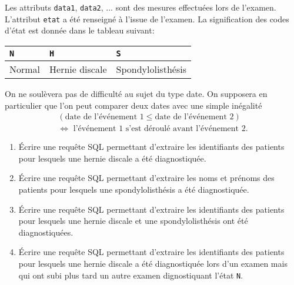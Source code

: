 Les attributs \texttt{data1}, \texttt{data2}, ... sont des mesures effectuées lors de l'examen. L'attribut \texttt{etat} a été renseigné à l'issue de l'examen. La signification des codes d'état est donnée dans le tableau suivant:
\begin{center}
\renewcommand{\arraystretch}{1.2}
\begin{tabular}{|l|l|l|} \hline
\texttt{N} & \texttt{H}     & \texttt{S} \\ \hline
Normal     & Hernie discale & Spondylolisthésis \\ \hline
\end{tabular}
\end{center}
On ne soulèvera pas de difficulté au sujet du type \og date\fg. On supposera en particulier que l'on peut comparer deux dates avec une simple inégalité
\begin{multline*}
 \left( \text{date de l'événement 1} \leq \text{date de l'événement 2}\right)\\
 \Leftrightarrow \text{ l'événement 1 s'est déroulé avant l'événement 2}.
\end{multline*}
\begin{enumerate}
 \item \'Ecrire une requête SQL permettant d'extraire les identifiants des patients pour lesquels une hernie discale a été diagnostiquée.
 \item \'Ecrire une requête SQL permettant d'extraire les noms et prénoms des patients pour lesquels une spondylolisthésis a été diagnostiquée.
 \item \'Ecrire une requête SQL permettant d'extraire les identifiants des patients pour lesquels une hernie discale et une spondylolisthésis ont été diagnostiquées.
 \item \'Ecrire une requête SQL permettant d'extraire les identifiants des patients pour lesquels une hernie discale a été diagnostiquée lors d'un examen mais qui ont subi plus tard un autre examen dignostiquant l'état \texttt{N}.
\end{enumerate}

